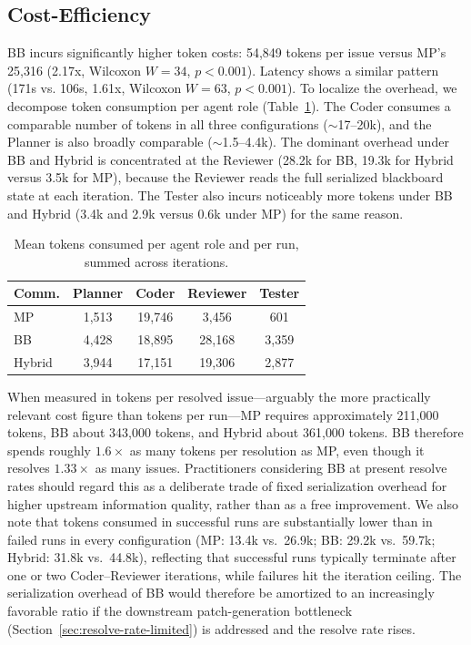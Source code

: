 \documentclass{ieeeaccess}
\begin{document}
\subsection{Cost-Efficiency}

BB incurs significantly higher token costs: 54,849 tokens per issue versus MP's 25,316 (2.17x, Wilcoxon $W=34$, $p<0.001$). Latency shows a similar pattern (171s vs. 106s, 1.61x, Wilcoxon $W=63$, $p<0.001$). To localize the overhead, we decompose token consumption per agent role (Table~\ref{tab:cost-per-stage}). The Coder consumes a comparable number of tokens in all three configurations ($\sim$17--20k), and the Planner is also broadly comparable ($\sim$1.5--4.4k). The dominant overhead under BB and Hybrid is concentrated at the Reviewer (28.2k for BB, 19.3k for Hybrid versus 3.5k for MP), because the Reviewer reads the full serialized blackboard state at each iteration. The Tester also incurs noticeably more tokens under BB and Hybrid (3.4k and 2.9k versus 0.6k under MP) for the same reason.

\begin{table}[!ht]
\centering
\small
\caption{Mean tokens consumed per agent role and per run, summed across iterations.}
\label{tab:cost-per-stage}
\begin{tabular}{lcccc}
\toprule
\textbf{Comm.} & \textbf{Planner} & \textbf{Coder} & \textbf{Reviewer} & \textbf{Tester} \\
\midrule
MP     & 1{,}513 & 19{,}746 &  3{,}456 & 601 \\
BB     & 4{,}428 & 18{,}895 & 28{,}168 & 3{,}359 \\
Hybrid & 3{,}944 & 17{,}151 & 19{,}306 & 2{,}877 \\
\bottomrule
\end{tabular}
\end{table}

When measured in tokens per resolved issue---arguably the more practically relevant cost figure than tokens per run---MP requires approximately 211{,}000 tokens, BB about 343{,}000 tokens, and Hybrid about 361{,}000 tokens. BB therefore spends roughly $1.6\times$ as many tokens per resolution as MP, even though it resolves $1.33\times$ as many issues. Practitioners considering BB at present resolve rates should regard this as a deliberate trade of fixed serialization overhead for higher upstream information quality, rather than as a free improvement. We also note that tokens consumed in successful runs are substantially lower than in failed runs in every configuration (MP: 13.4k vs.\ 26.9k; BB: 29.2k vs.\ 59.7k; Hybrid: 31.8k vs.\ 44.8k), reflecting that successful runs typically terminate after one or two Coder--Reviewer iterations, while failures hit the iteration ceiling. The serialization overhead of BB would therefore be amortized to an increasingly favorable ratio if the downstream patch-generation bottleneck (Section~\ref{sec:resolve-rate-limited}) is addressed and the resolve rate rises.
\end{document}
